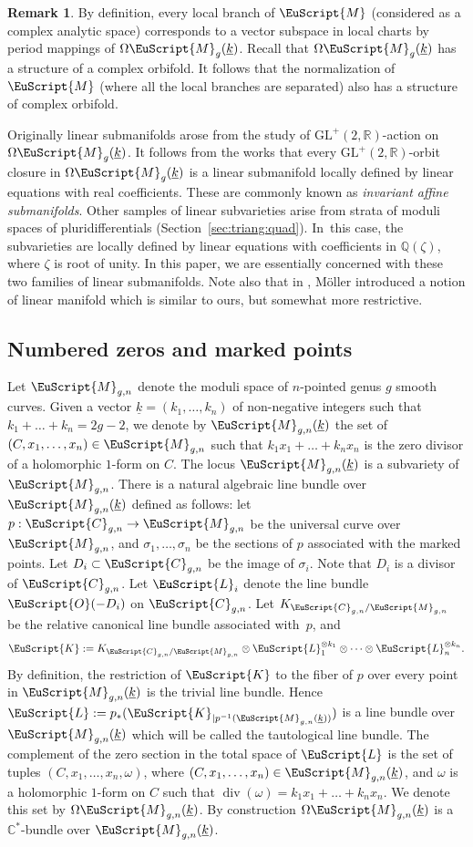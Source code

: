 \documentclass[JEP,XML,SOM,Unicode]{cedram}
\let\mathcal\EuScript
\DeclareMathOperator{\Div}{div}
\theoremstyle{plain}
\theoremstyle{definition}
\newtheorem{Remark}[Theorem]{Remark}
\newcommand{\R}{\mathbb{R}}
\def\C{\mathbb{C}}
\newcommand{\Q}{\mathbb{Q}}
\newcommand{\Ccal}{\mathcal{C}}
\newcommand{\Kcal}{\mathcal{K}}
\newcommand{\Lcal}{\mathcal{L}}
\newcommand{\Mcal}{\mathcal{M}}
\newcommand{\Ocal}{\mathcal{O}}
\newcommand{\cM}{\mathcal{M}}
\newcommand{\GL}{\mathrm{GL}}
\let\omg\omega
\let\ul\underline
\newcommand{\trate}{\Omega\Mcal_{g}(\ul{k})}
\begin{document}
\begin{Remark}\label{rk:lin:subman:orbifold}
By definition, every local branch of $\cM$ (considered as a complex analytic space) corresponds to a vector subspace in local charts by period mappings of $\trate$.
Recall that $\trate$ has a structure of a complex orbifold. It follows that the normalization of $\cM$ (where all the local branches are separated) also has a structure of complex orbifold.
\end{Remark}

Originally linear submanifolds arose from the study of $\GL^+(2,\R)$-action on $\trate$. It follows from the works \cite{EM18, EMM15, Filip16} that every $\GL^+(2,\R)$-orbit closure in $\trate$ is a linear submanifold locally defined by linear equations with real coefficients. These are commonly known as \emph{invariant affine submanifolds}. Other samples of linear subvarieties arise from strata of moduli spaces of pluri\-differentials (\cf Section~\ref{sec:triang:quad}). In~this case, the subvarieties are locally defined by linear equations with coefficients in $\Q(\zeta)$, where $\zeta$ is root of unity. In this paper, we are essentially concerned with these two families of linear submanifolds.
Note also that in \cite[Def.\,6.4]{Moller08}, Möller introduced a notion of linear manifold which is similar to ours, but somewhat more restrictive.

\subsection{Numbered zeros and marked points}\label{subsec:numb:zeros}
Let $\cM_{g,n}$ denote the moduli space of $n$-pointed genus $g$ smooth curves. Given a vector $\ul{k}=(k_1,\dots,k_n)$ of non-negative integers such that $k_1+\dots+k_n=2g-2$, we denote by $\cM_{g,n}(\ul{k})$ the set of $(C,x_1,\dots,x_n) \in \cM_{g,n}$ such that $k_1x_1+\dots+k_nx_n$ is the zero divisor of a holomorphic $1$-form on $C$. The locus $\cM_{g,n}(\ul{k})$ is a subvariety of $\cM_{g,n}$. There is a natural algebraic line bundle over $\cM_{g,n}(\ul{k})$ defined as follows: let $p:\Ccal_{g,n}\to \cM_{g,n}$ be the universal curve over $\cM_{g,n}$, and $\sigma_1,\dots,\sigma_n$ be the sections of $p$ associated with the marked points. Let $D_i\subset \Ccal_{g,n}$ be the image of $\sigma_i$. Note that $D_i$ is a divisor of $\Ccal_{g,n}$.
Let $\Lcal_i$ denote the line bundle $\Ocal(-D_i)$ on $\Ccal_{g,n}$. Let $K_{\Ccal_{g,n}/\cM_{g,n}}$ be the relative canonical line bundle associated with~$p$, and
\[
\Kcal:=K_{\Ccal_{g,n}/\cM_{g,n}}\otimes\Lcal_1^{\otimes k_1}\otimes\dots\otimes\Lcal_n^{\otimes k_n}.
\]
By definition, the restriction of $\Kcal$ to the fiber of $p$ over every point in $\cM_{g,n}(\ul{k})$ is the trivial line bundle. Hence $\Lcal:=p_*(\Kcal_{|p^{-1}(\cM_{g,n}(\ul{k}))})$ is a line bundle over $\cM_{g,n}(\ul{k})$ which will be called the tautological line bundle.
The complement of the zero section in the total space of $\Lcal$ is the set of tuples $(C,x_1,\dots,x_n,\omg)$, where $(C,x_1,\dots,x_n) \in\nobreak \cM_{g,n}(\ul{k})$, and $\omg$ is a holomorphic $1$-form on $C$ such that $\Div(\omg)=k_1x_1+\dots+k_nx_n$. We denote this set by $\Omega\cM_{g,n}(\ul{k})$. By construction $\Omega\cM_{g,n}(\ul{k})$ is a $\C^*$-bundle over $\cM_{g,n}(\ul{k})$.
\end{document}
